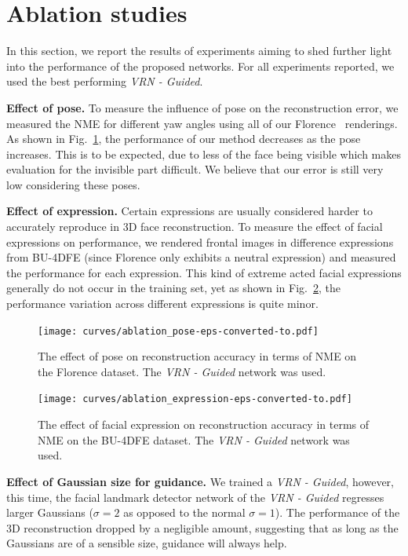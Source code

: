 \section{Ablation studies}

In this section, we report the results of experiments aiming to shed
further light into the performance of the proposed networks. For all
experiments reported, we used the best performing \textit{VRN -
  Guided}.

\textbf{Effect of pose.} To measure the influence
of pose on the reconstruction error, we measured the NME for different
yaw angles using all of our Florence~\cite{masi2d3dFaceData}
renderings. As shown in Fig.~\ref{fig:effect_pose}, the performance of
our method decreases as the pose increases. This is to be expected,
due to less of the face being visible which makes evaluation for the
invisible part difficult. We believe that our error is still very low
considering these
poses. %


\textbf{Effect of expression.} Certain expressions are usually considered harder to accurately reproduce in 3D face
reconstruction. To measure the effect of facial expressions on performance, we rendered frontal images in difference expressions from BU-4DFE (since Florence only
exhibits a neutral expression) and measured the performance for each expression. This kind of extreme acted facial
expressions generally do not occur in the training set, yet as shown in Fig.~\ref{fig:effect_expression}, the performance variation across different expressions is quite minor.

\begin{figure}
\centering
  \texttt{[image: curves/ablation\_pose-eps-converted-to.pdf]}
  \caption{The effect of pose on reconstruction accuracy in terms of NME on the Florence dataset. The \textit{VRN - Guided} network was used.}
  \label{fig:effect_pose}
\end{figure}



\begin{figure}
  \centering
  \texttt{[image: curves/ablation\_expression-eps-converted-to.pdf]}
  \caption{The effect of facial expression on reconstruction accuracy in terms of NME on the BU-4DFE dataset. The \textit{VRN - Guided} network was used.}
  \label{fig:effect_expression}
\end{figure}

\textbf{Effect of Gaussian size for guidance.} We trained a
\textit{VRN - Guided}, however, this time,
the facial landmark detector network of the \textit{VRN - Guided} regresses larger Gaussians ($\sigma = 2$ as
opposed to the normal $\sigma = 1$). The performance of the 3D
reconstruction dropped by a negligible amount, suggesting that as long
as the Gaussians are of a sensible size, guidance will always help.



